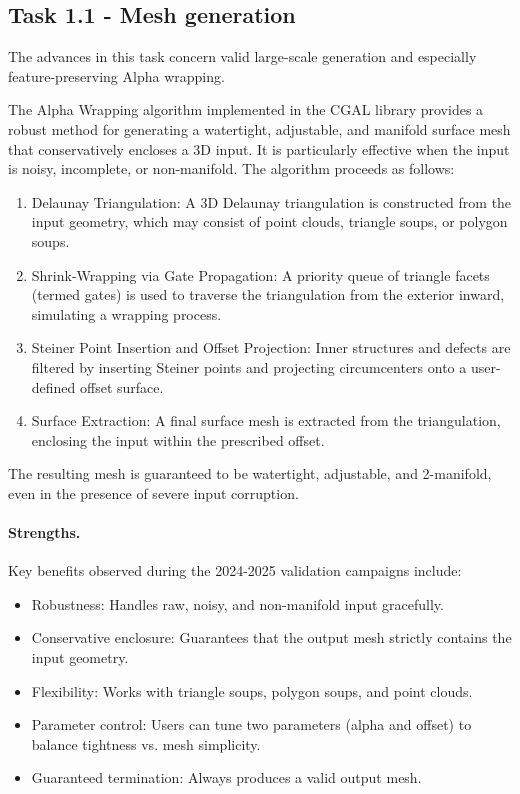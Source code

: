 \subsection{Task 1.1 - Mesh generation}
The advances in this task concern valid large-scale generation and especially feature-preserving Alpha wrapping.

The Alpha Wrapping algorithm implemented in the CGAL library provides a robust method for generating a watertight, adjustable, and manifold surface mesh that conservatively encloses a 3D input. It is particularly effective when the input is noisy, incomplete, or non-manifold. The algorithm proceeds as follows:

\begin{enumerate}
\item Delaunay Triangulation: A 3D Delaunay triangulation is constructed from the input geometry, which may consist of point clouds, triangle soups, or polygon soups.
\item Shrink-Wrapping via Gate Propagation: A priority queue of triangle facets (termed gates) is used to traverse the triangulation from the exterior inward, simulating a wrapping process.
\item Steiner Point Insertion and Offset Projection: Inner structures and defects are filtered by inserting Steiner points and projecting circumcenters onto a user-defined offset surface.
\item Surface Extraction: A final surface mesh is extracted from the triangulation, enclosing the input within the prescribed offset.
\end{enumerate}

The resulting mesh is guaranteed to be watertight, adjustable, and 2-manifold, even in the presence of severe input corruption.

\paragraph{Strengths.}
Key benefits observed during the 2024-2025 validation campaigns include:
\begin{itemize}
\item Robustness: Handles raw, noisy, and non-manifold input gracefully.
\item Conservative enclosure: Guarantees that the output mesh strictly contains the input geometry.
\item Flexibility: Works with triangle soups, polygon soups, and point clouds.
\item Parameter control: Users can tune two parameters (alpha and offset) to balance tightness vs. mesh simplicity.
\item Guaranteed termination: Always produces a valid output mesh.
\end{itemize}

